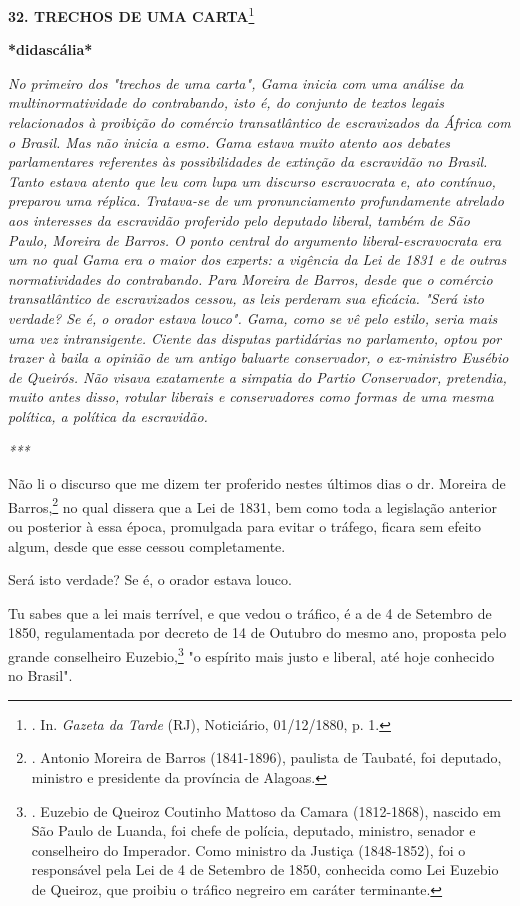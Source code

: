 \textbf{32. TRECHOS DE UMA CARTA}\footnote{. In. \emph{Gazeta da Tarde}
  (RJ), Noticiário, 01/12/1880, p. 1.}

\textbf{*didascália*}

\emph{No primeiro dos "trechos de uma carta", Gama inicia com uma
análise da multinormatividade do contrabando, isto é, do conjunto de
textos legais relacionados à proibição do comércio transatlântico de
escravizados da África com o Brasil. Mas não inicia a esmo. Gama estava
muito atento aos debates parlamentares referentes às possibilidades de
extinção da escravidão no Brasil. Tanto estava atento que leu com lupa
um discurso escravocrata e, ato contínuo, preparou uma réplica.
Tratava-se de um pronunciamento profundamente atrelado aos interesses da
escravidão proferido pelo deputado liberal, também de São Paulo, Moreira
de Barros. O ponto central do argumento liberal-escravocrata era um no
qual Gama era o maior dos experts: a vigência da Lei de 1831 e de outras
normatividades do contrabando. Para Moreira de Barros, desde que o
comércio transatlântico de escravizados cessou, as leis perderam sua
eficácia. "Será isto verdade? Se é, o orador estava louco". Gama, como
se vê pelo estilo, seria mais uma vez intransigente. Ciente das disputas
partidárias no parlamento, optou por trazer à baila a opinião de um
antigo baluarte conservador, o ex-ministro Eusébio de Queirós. Não
visava exatamente a simpatia do Partio Conservador, pretendia, muito
antes disso, rotular liberais e conservadores como formas de uma mesma
política, a política da escravidão. }

\emph{***}

Não li o discurso que me dizem ter proferido nestes últimos dias o dr.
Moreira de Barros,\footnote{. Antonio Moreira de Barros (1841-1896),
  paulista de Taubaté, foi deputado, ministro e presidente da província
  de Alagoas.} no qual dissera que a Lei de 1831, bem como toda a
legislação anterior ou posterior à essa época, promulgada para evitar o
tráfego, ficara sem efeito algum, desde que esse cessou completamente.

Será isto verdade? Se é, o orador estava louco.

Tu sabes que a lei mais terrível, e que vedou o tráfico, é a de 4 de
Setembro de 1850, regulamentada por decreto de 14 de Outubro do mesmo
ano, proposta pelo grande conselheiro Euzebio,\footnote{. Euzebio de
  Queiroz Coutinho Mattoso da Camara (1812-1868), nascido em São Paulo
  de Luanda, foi chefe de polícia, deputado, ministro, senador e
  conselheiro do Imperador. Como ministro da Justiça (1848-1852), foi o
  responsável pela Lei de 4 de Setembro de 1850, conhecida como Lei
  Euzebio de Queiroz, que proibiu o tráfico negreiro em caráter
  terminante.} "o espírito
mais justo e liberal, até hoje conhecido no Brasil".


